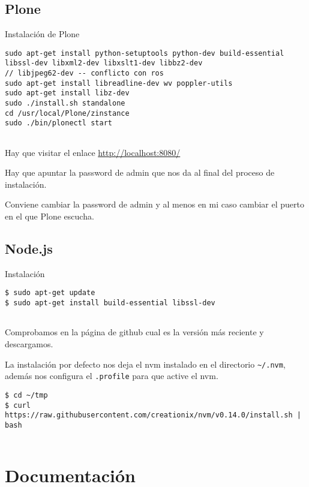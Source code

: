 \subsection{Plone}\label{plone}

Instalación de Plone

\begin{verbatim}
sudo apt-get install python-setuptools python-dev build-essential libssl-dev libxml2-dev libxslt1-dev libbz2-dev
// libjpeg62-dev -- conflicto con ros
sudo apt-get install libreadline-dev wv poppler-utils
sudo apt-get install libz-dev
sudo ./install.sh standalone
cd /usr/local/Plone/zinstance
sudo ./bin/plonectl start
      
\end{verbatim}

Hay que visitar el enlace \url{http://localhost:8080/}

Hay que apuntar la password de admin que nos da al final del proceso de
instalación.

Conviene cambiar la password de admin y al menos en mi caso cambiar el
puerto en el que Plone escucha.

\subsection{Node.js}\label{node.js}

Instalación

\begin{verbatim}
$ sudo apt-get update
$ sudo apt-get install build-essential libssl-dev
      
\end{verbatim}

Comprobamos en la página de github cual es la versión más reciente y
descargamos.

La instalación por defecto nos deja el nvm instalado en el directorio
\texttt{\textasciitilde{}/.nvm}, además nos configura el
\texttt{.profile} para que active el nvm.

\begin{verbatim}
$ cd ~/tmp
$ curl https://raw.githubusercontent.com/creationix/nvm/v0.14.0/install.sh | bash
      
\end{verbatim}

\section{Documentación}\label{documentaciuxf3n}

